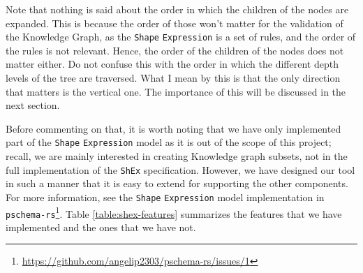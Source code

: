 \label{example:shex_tree}

Note that nothing is said about the order in which the children of the nodes are expanded. This is because the order of those won't matter for the validation of the Knowledge Graph, as the \texttt{Shape} \texttt{Expression} is a set of rules, and the order of the rules is not relevant. Hence, the order of the children of the nodes does not matter either. Do not confuse this with the order in which the different depth levels of the tree are traversed. What I mean by this is that the only direction that matters is the vertical one. The importance of this will be discussed in the next section.

Before commenting on that, it is worth noting that we have only implemented part of the \texttt{Shape} \texttt{Expression} model as it is out of the scope of this project; recall, we are mainly interested in creating Knowledge graph subsets, not in the full implementation of the \texttt{ShEx} specification. However, we have designed our tool in such a manner that it is easy to extend for supporting the other components. For more information, see the \texttt{Shape} \texttt{Expression} model implementation in \texttt{pschema-rs}\footnote{\url{https://github.com/angelip2303/pschema-rs/issues/1}}. Table \ref{table:shex-features} summarizes the features that we have implemented and the ones that we have not.

